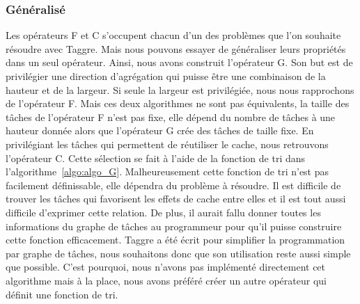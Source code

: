 \subsubsection{Généralisé}
Les opérateurs F et C s'occupent chacun d'un des problèmes que l'on souhaite résoudre avec Taggre.
%
Mais nous pouvons essayer de généraliser leurs propriétés dans un seul opérateur.
%
Ainsi, nous avons construit l'opérateur G.
%
Son but est de privilégier une direction d'agrégation qui puisse être une combinaison de la hauteur et de la largeur.
%
Si seule la largeur est privilégiée, nous nous rapprochons de l'opérateur F.
%
Mais ces deux algorithmes ne sont pas équivalents, la taille des tâches de l'opérateur F n'est pas fixe, elle dépend du nombre de tâches à une hauteur donnée alors que l'opérateur G crée des tâches de taille fixe.
%
En privilégiant les tâches qui permettent de réutiliser le cache, nous retrouvons l'opérateur C.
%
Cette sélection se fait à l'aide de la fonction de tri dans l'algorithme~\ref{algo:algo_G}.
%
Malheureusement cette fonction de tri n'est pas facilement définissable, elle dépendra du problème à résoudre.
%
Il est difficile de trouver les tâches qui favorisent les effets de cache entre elles et il est tout aussi difficile d'exprimer cette relation.
%
De plus, il aurait fallu donner toutes les informations du graphe de tâches au programmeur pour qu'il puisse construire cette fonction efficacement.
%
Taggre a été écrit pour simplifier la programmation par graphe de tâches, nous souhaitons donc que son utilisation reste aussi simple que possible.
%
C'est pourquoi, nous n'avons pas implémenté directement cet algorithme mais à la place, nous avons préféré créer un autre opérateur qui définit une fonction de tri.


